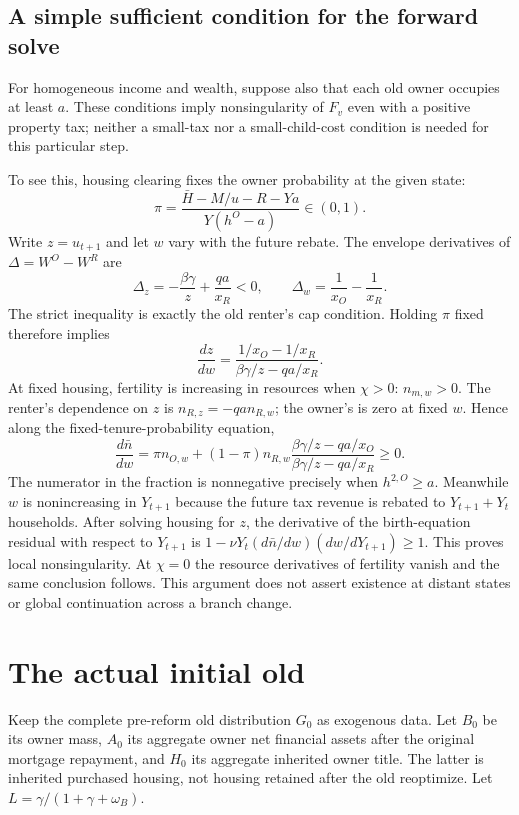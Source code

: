 \documentclass[
  11pt,
]{article}
\begin{document}
\subsection{A simple sufficient condition for the forward
solve}\label{a-simple-sufficient-condition-for-the-forward-solve}

For homogeneous income and wealth, suppose also that each old owner
occupies at least \(a\). These conditions imply nonsingularity of
\(F_v\) even with a positive property tax; neither a small-tax nor a
small-child-cost condition is needed for this particular step.

To see this, housing clearing fixes the owner probability at the given
state: \[
 \pi=\frac{\bar H-M/u-R-Ya}{Y(h^O-a)}\in(0,1).
\] Write \(z=u_{t+1}\) and let \(w\) vary with the future rebate. The
envelope derivatives of \(\Delta=W^O-W^R\) are \[
 \Delta_z=-\frac{\beta\gamma}{z}+\frac{qa}{x_R}<0,
 \qquad \Delta_w=\frac1{x_O}-\frac1{x_R}.
\] The strict inequality is exactly the old renter's cap condition.
Holding \(\pi\) fixed therefore implies \[
 \frac{dz}{dw}=\frac{1/x_O-1/x_R}
                    {\beta\gamma/z-qa/x_R}.
\] At fixed housing, fertility is increasing in resources when
\(\chi>0\): \(n_{m,w}>0\). The renter's dependence on \(z\) is
\(n_{R,z}=-qa n_{R,w}\); the owner's is zero at fixed \(w\). Hence along
the fixed-tenure-probability equation, \[
 \frac{d\bar n}{dw}=\pi n_{O,w}
 +(1-\pi)n_{R,w}
       \frac{\beta\gamma/z-qa/x_O}{\beta\gamma/z-qa/x_R}\geq0.
\] The numerator in the fraction is nonnegative precisely when
\(h^{2,O}\geq a\). Meanwhile \(w\) is nonincreasing in \(Y_{t+1}\)
because the future tax revenue is rebated to \(Y_{t+1}+Y_t\) households.
After solving housing for \(z\), the derivative of the birth-equation
residual with respect to \(Y_{t+1}\) is
\(1-\nu Y_t(d\bar n/dw)(dw/dY_{t+1})\geq1\). This proves local
nonsingularity. At \(\chi=0\) the resource derivatives of fertility
vanish and the same conclusion follows. This argument does not assert
existence at distant states or global continuation across a branch
change.

\section{The actual initial old}\label{the-actual-initial-old}

Keep the complete pre-reform old distribution \(G_0\) as exogenous data.
Let \(B_0\) be its owner mass, \(A_0\) its aggregate owner net financial
assets after the original mortgage repayment, and \(H_0\) its aggregate
inherited owner title. The latter is inherited purchased housing, not
housing retained after the old reoptimize. Let
\(L=\gamma/(1+\gamma+\omega_B)\).
\end{document}

